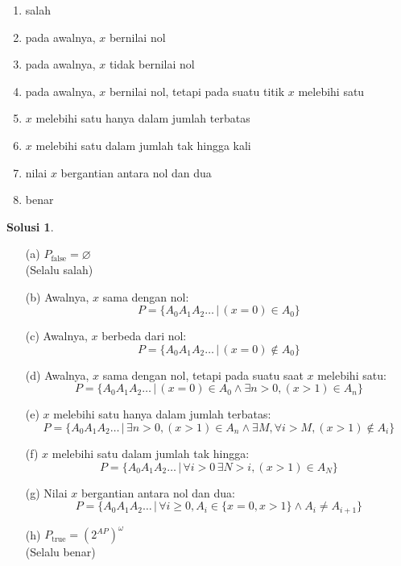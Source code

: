 \documentclass[a4paper]{article}
\theoremstyle{definition}
\newtheorem*{solusi}{Solusi}
\begin{document}
\begin{enumerate}
    \item salah
    \item pada awalnya, \( x \) bernilai nol
    \item pada awalnya, \( x \) tidak bernilai nol
    \item pada awalnya, \( x \) bernilai nol, tetapi pada suatu titik \( x \) melebihi satu
    \item \( x \) melebihi satu hanya dalam jumlah terbatas
    \item \( x \) melebihi satu dalam jumlah tak hingga kali
    \item nilai \( x \) bergantian antara nol dan dua
    \item benar
\end{enumerate}

\begin{solusi}
  $\,$
  \begin{enumerate}
    \item[(a)] $P_{\text{false}} = \varnothing$ \\ (Selalu salah)
    
    \item[(b)] Awalnya, $x$ sama dengan nol:
    \[
    P=\{A_0A_1A_2\dots\,|\,(x=0)\in A_0\}
    \]
    
    \item[(c)] Awalnya, $x$ berbeda dari nol:
    \[
    P=\{A_0A_1A_2\dots\,|\,(x=0)\notin A_0\}
    \]

    \item[(d)] Awalnya, $x$ sama dengan nol, tetapi pada suatu saat $x$ melebihi satu:
    \[
    P=\{A_0A_1A_2\dots\,|\,(x=0)\in A_0\land\exists n>0,(x>1)\in A_n\}
    \]

    \item[(e)] $x$ melebihi satu hanya dalam jumlah terbatas:
    \[
    P=\{A_0A_1A_2\dots\,|\,\exists n>0,(x>1)\in A_n\land\exists M,\forall i>M,(x> 1)\notin A_i\}
    \]

    \item[(f)] $x$ melebihi satu dalam jumlah tak hingga:
    \[
    P=\{A_0A_1A_2\dots\,|\,\forall i>0\,\exists N>i, (x>1)\in A_N\}
    \]

    \item[(g)] Nilai $x$ bergantian antara nol dan dua:
    \[
    P=\{A_0A_1A_2\dots\,|\,\forall i\geq 0,A_{i}\in\{x=0,x>1\}\land A_{i}\ne A_{i+1}\}
    \]

    \item[(h)] $P_{\text{true}}=(2^{AP})^\omega$\\
    (Selalu benar)
  \end{enumerate}
\end{solusi}
  
\end{document}
